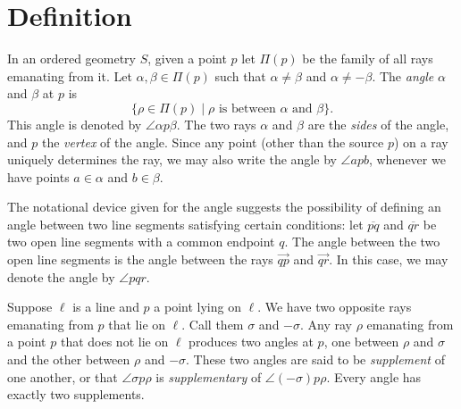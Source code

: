 \documentclass[12pt]{article}
\newcommand{\ray}[1]{\overrightarrow{#1}}
\begin{document}
\section{Definition}
In an ordered geometry $S$, given a point $p$ let $\Pi(p)$ be the family of
all rays emanating from it.  Let $\alpha,\beta\in\Pi(p)$ such that
$\alpha\neq\beta$ and $\alpha\neq-\beta$.  The \emph{angle}  
$\alpha$ and $\beta$ at $p$ is
$$\lbrace \rho\in\Pi(p)\mid
\rho\mbox{ is between }\alpha\mbox{ and }\beta\rbrace.$$  This angle
is denoted by $\angle \alpha p\beta$.  The two rays $\alpha$ and
$\beta$ are the \emph{sides} of the angle, and $p$ the \emph{vertex} of the 
angle.  Since any point (other
than the source $p$) on a ray uniquely determines the ray, we may
also write the angle by $\angle apb$, whenever we have points
$a\in\alpha$ and $b\in\beta$.  

The notational device given for the angle suggests 
the possibility of defining an angle between two line segments satisfying certain conditions:
let $\overline{pq}$ and $\overline{qr}$ be two open line segments with a common endpoint 
$q$.  The angle between the two open line segments is the angle between the 
rays $\ray{qp}$ and $\ray{qr}$.  In this case, we may denote the angle by $\angle pqr$.

Suppose $\ell$ is a line and $p$ a point lying on $\ell$.  We have
two opposite rays emanating from $p$ that lie on $\ell$.  Call them
$\sigma$ and $-\sigma$.  Any ray $\rho$ emanating from a point $p$
that does not lie on $\ell$ produces two angles at $p$, one between
$\rho$ and $\sigma$ and the other between $\rho$ and $-\sigma$.
These two angles are said to be \emph{supplement} of one another, or
that $\angle \sigma p \rho$ is \emph{supplementary} of $\angle
(-\sigma) p \rho$.  Every angle has exactly two supplements.
\end{document}
